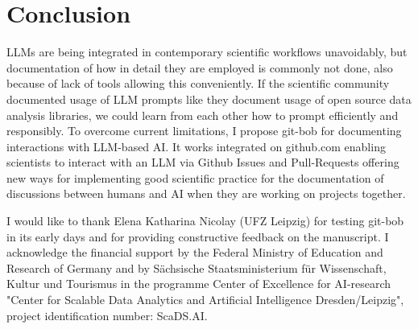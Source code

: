 \documentclass{ecai}
\begin{document}

\section{Conclusion}

LLMs are being integrated in contemporary scientific workflows unavoidably, but documentation of how in detail they are employed is commonly not done, also because of lack of tools allowing this conveniently. If the scientific community documented usage of LLM prompts like they document usage of open source data analysis libraries, we could learn from each other how to prompt efficiently and responsibly. To overcome current limitations, I propose git-bob for documenting interactions with LLM-based AI. It works integrated on github.com enabling scientists to interact with an LLM via Github Issues and Pull-Requests offering new ways for implementing good scientific practice for the documentation of discussions between humans and AI when they are working on projects together.



\begin{ack}
I would like to thank Elena Katharina Nicolay (UFZ Leipzig) for testing git-bob in its early days and for providing constructive feedback on the manuscript. I acknowledge the financial support by the Federal Ministry of Education and Research of Germany and by Sächsische Staatsministerium für Wissenschaft, Kultur und Tourismus in the programme Center of Excellence for AI-research "Center for Scalable Data Analytics and Artificial Intelligence Dresden/Leipzig", project identification number: ScaDS.AI.

\end{ack}




\end{document}
